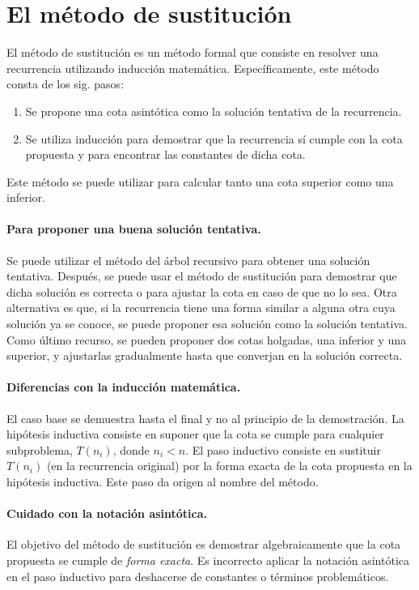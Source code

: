 \section{El método de sustitución}

El método de sustitución es un método formal que consiste en resolver una recurrencia utilizando inducción matemática. 
Específicamente, este método consta de los sig. pasos:
\begin{enumerate}
  \item Se propone una cota asintótica como la solución tentativa de la recurrencia.
  \item Se utiliza inducción para demostrar que la recurrencia sí cumple con la cota propuesta y para encontrar las constantes de dicha cota.
\end{enumerate}
Este método se puede utilizar para calcular tanto una cota superior como una inferior.

\paragraph{Para proponer una buena solución tentativa.}{%
  Se puede utilizar el método del árbol recursivo para obtener una solución tentativa.
  Después, se puede usar el método de sustitución para demostrar que dicha solución es correcta o para ajustar la cota en caso de que no lo sea.
  Otra alternativa es que, si la recurrencia tiene una forma similar a alguna otra cuya solución ya se conoce, se puede proponer esa solución como la solución tentativa.
  Como último recurso, se pueden proponer dos cotas holgadas, una inferior y  una superior, y ajustarlas gradualmente hasta que converjan en la solución correcta. 
}
\paragraph{Diferencias con la inducción matemática.}{%
  El caso base se demuestra hasta el final y no al principio de la demostración.
  La hipótesis inductiva consiste en suponer que la cota se cumple para cualquier subproblema, \(T(n_i)\), donde \(n_i<n\). 
  El paso inductivo consiste en sustituir \(T(n_i)\) (en la recurrencia original) por la forma exacta de la cota propuesta en la hipótesis inductiva. 
  Este paso da origen al nombre del método.
}
\paragraph{Cuidado con la notación asintótica.} {%
  El objetivo del método de sustitución es demostrar algebraicamente que 
  la cota propuesta se cumple de \emph{forma exacta}.
  Es incorrecto aplicar la notación asintótica en el paso inductivo para deshacerse de constantes o términos problemáticos.
}
